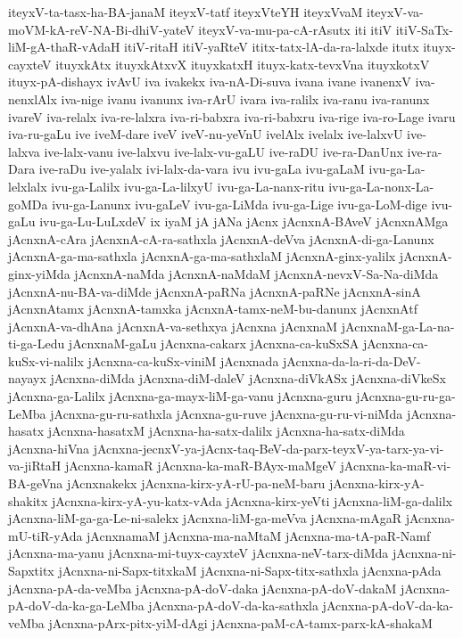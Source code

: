 {iteyxV-ta-tasx-ha-BA-janaM
iteyxV-tatf
iteyxVteYH
iteyxVvaM
iteyxV-va-moVM-kA-reV-NA-Bi-dhiV-yateV
iteyxV-va-mu-pa-cA-rAsutx
iti
itiV
itiV-SaTx-liM-gA-thaR-vAdaH
itiV-ritaH
itiV-yaRteV
ititx-tatx-lA-da-ra-lalxde
itutx
ituyx-cayxteV
ituyxkAtx
ituyxkAtxvX
ituyxkatxH
ituyx-katx-tevxVna
ituyxkotxV
ituyx-pA-dishayx
ivAvU
iva
ivakekx
iva-nA-Di-suva
ivana
ivane
ivanenxV
iva-nenxlAlx
iva-nige
ivanu
ivanunx
iva-rArU
ivara
iva-ralilx
iva-ranu
iva-ranunx
ivareV
iva-relalx
iva-re-lalxra
iva-ri-babxra
iva-ri-babxru
iva-rige
iva-ro-Lage
ivaru
iva-ru-gaLu
ive
iveM-dare
iveV
iveV-nu-yeVnU
ivelAlx
ivelalx
ive-lalxvU
ive-lalxva
ive-lalx-vanu
ive-lalxvu
ive-lalx-vu-gaLU
ive-raDU
ive-ra-DanUnx
ive-ra-Dara
ive-raDu
ive-yalalx
ivi-lalx-da-vara
ivu
ivu-gaLa
ivu-gaLaM
ivu-ga-La-lelxlalx
ivu-ga-Lalilx
ivu-ga-La-lilxyU
ivu-ga-La-nanx-ritu
ivu-ga-La-nonx-La-goMDa
ivu-ga-Lanunx
ivu-gaLeV
ivu-ga-LiMda
ivu-ga-Lige
ivu-ga-LoM-dige
ivu-gaLu
ivu-ga-Lu-LuLxdeV
ix
iyaM
jA
jANa
jAcnx
jAcnxnA-BAveV
jAcnxnAMga
jAcnxnA-cAra
jAcnxnA-cA-ra-sathxla
jAcnxnA-deVva
jAcnxnA-di-ga-Lanunx
jAcnxnA-ga-ma-sathxla
jAcnxnA-ga-ma-sathxlaM
jAcnxnA-ginx-yalilx
jAcnxnA-ginx-yiMda
jAcnxnA-naMda
jAcnxnA-naMdaM
jAcnxnA-nevxV-Sa-Na-diMda
jAcnxnA-nu-BA-va-diMde
jAcnxnA-paRNa
jAcnxnA-paRNe
jAcnxnA-sinA
jAcnxnAtamx
jAcnxnA-tamxka
jAcnxnA-tamx-neM-bu-danunx
jAcnxnAtf
jAcnxnA-va-dhAna
jAcnxnA-va-sethxya
jAcnxna
jAcnxnaM
jAcnxnaM-ga-La-na-ti-ga-Ledu
jAcnxnaM-gaLu
jAcnxna-cakarx
jAcnxna-ca-kuSxSA
jAcnxna-ca-kuSx-vi-nalilx
jAcnxna-ca-kuSx-viniM
jAcnxnada
jAcnxna-da-la-ri-da-DeV-nayayx
jAcnxna-diMda
jAcnxna-diM-daleV
jAcnxna-diVkASx
jAcnxna-diVkeSx
jAcnxna-ga-Lalilx
jAcnxna-ga-mayx-liM-ga-vanu
jAcnxna-guru
jAcnxna-gu-ru-ga-LeMba
jAcnxna-gu-ru-sathxla
jAcnxna-gu-ruve
jAcnxna-gu-ru-vi-niMda
jAcnxna-hasatx
jAcnxna-hasatxM
jAcnxna-ha-satx-dalilx
jAcnxna-ha-satx-diMda
jAcnxna-hiVna
jAcnxna-jecnxV-ya-jAcnx-taq-BeV-da-parx-teyxV-ya-tarx-ya-vi-va-jiRtaH
jAcnxna-kamaR
jAcnxna-ka-maR-BAyx-maMgeV
jAcnxna-ka-maR-vi-BA-geVna
jAcnxnakekx
jAcnxna-kirx-yA-rU-pa-neM-baru
jAcnxna-kirx-yA-shakitx
jAcnxna-kirx-yA-yu-katx-vAda
jAcnxna-kirx-yeVti
jAcnxna-liM-ga-dalilx
jAcnxna-liM-ga-ga-Le-ni-salekx
jAcnxna-liM-ga-meVva
jAcnxna-mAgaR
jAcnxna-mU-tiR-yAda
jAcnxnamaM
jAcnxna-ma-naMtaM
jAcnxna-ma-tA-paR-Namf
jAcnxna-ma-yanu
jAcnxna-mi-tuyx-cayxteV
jAcnxna-neV-tarx-diMda
jAcnxna-ni-Sapxtitx
jAcnxna-ni-Sapx-titxkaM
jAcnxna-ni-Sapx-titx-sathxla
jAcnxna-pAda
jAcnxna-pA-da-veMba
jAcnxna-pA-doV-daka
jAcnxna-pA-doV-dakaM
jAcnxna-pA-doV-da-ka-ga-LeMba
jAcnxna-pA-doV-da-ka-sathxla
jAcnxna-pA-doV-da-ka-veMba
jAcnxna-pArx-pitx-yiM-dAgi
jAcnxna-paM-cA-tamx-parx-kA-shakaM
}
